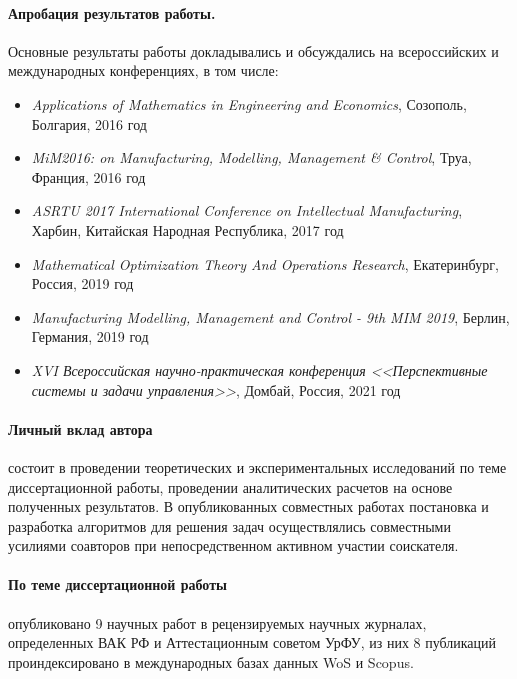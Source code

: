 \paragraph*{Апробация результатов работы.}
Основные результаты работы докладывались и обсуждались на всероссийских и международных конференциях, в том числе:

\begin{itemize}
    \item
    \textit{Applications of Mathematics in Engineering and Economics},
    Созополь, Болгария, 2016 год
    \item
    \textit{MiM2016: on Manufacturing, Modelling, Management \& Control},
    Труа, Франция, 2016 год
    \item
    \textit{ASRTU 2017 International Conference on Intellectual Manufacturing},
    Харбин, Китайская Народная Республика, 2017 год
    \item
    \textit{Mathematical Optimization Theory And Operations Research},
    Екатеринбург, Россия, 2019 год
    \item
    \textit{Manufacturing Modelling, Management and Control - 9th MIM 2019},
    Берлин, Германия, 2019 год
    \item
    \textit{XVI Всероссийская научно-практическая конференция
    <<Перспективные системы и задачи управления>>},
    Домбай, Россия, 2021 год
\end{itemize}

\paragraph*{Личный вклад автора}
состоит в проведении теоретических и экспериментальных исследований
по теме диссертационной работы,
проведении аналитических расчетов на основе полученных результатов.
В опубликованных совместных работах постановка и разработка алгоритмов для
решения задач осуществлялись совместными усилиями соавторов
при непосредственном активном участии соискателя.

\paragraph*{По теме диссертационной работы}
опубликовано
9 научных работ
в рецензируемых научных журналах,
определенных ВАК РФ и
Аттестационным советом УрФУ,
из них
8 публикаций проиндексировано в международных базах данных
WoS и Scopus.

